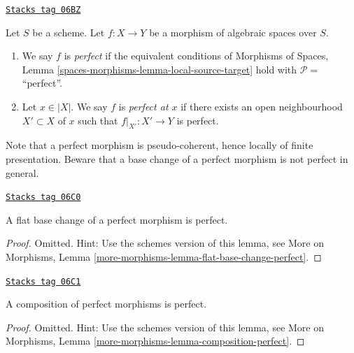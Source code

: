 \begin{definition}[Perfect]
\label{spaces-more-morphisms-definition-perfect}
\href{https://stacks.math.columbia.edu/tag/06BZ}{\texttt{Stacks tag 06BZ}}

Let $S$ be a scheme.
Let $f : X \to Y$ be a morphism of algebraic spaces over $S$.
\begin{enumerate}
\item We say $f$ is {\it perfect} if the equivalent conditions of
Morphisms of Spaces, Lemma \ref{spaces-morphisms-lemma-local-source-target}
hold with $\mathcal{P} =$``perfect''.
\item Let $x \in |X|$. We say $f$ is {\it perfect at $x$} if
there exists an open neighbourhood $X' \subset X$ of $x$ such
that $f|_{X'} : X' \to Y$ is perfect.
\end{enumerate}
\end{definition}

Note that a perfect morphism is pseudo-coherent, hence locally of finite
presentation. Beware that a base change of a perfect morphism is not perfect
in general.

\begin{lemma}
\label{spaces-more-morphisms-lemma-flat-base-change-perfect}
\href{https://stacks.math.columbia.edu/tag/06C0}{\texttt{Stacks tag 06C0}}

A flat base change of a perfect morphism is perfect.
\end{lemma}

\begin{proof}
Omitted. Hint: Use the schemes version of this lemma, see
More on Morphisms,
Lemma \ref{more-morphisms-lemma-flat-base-change-perfect}.
\end{proof}

\begin{lemma}
\label{spaces-more-morphisms-lemma-composition-perfect}
\href{https://stacks.math.columbia.edu/tag/06C1}{\texttt{Stacks tag 06C1}}

A composition of perfect morphisms is perfect.
\end{lemma}

\begin{proof}
Omitted. Hint: Use the schemes version of this lemma, see
More on Morphisms,
Lemma \ref{more-morphisms-lemma-composition-perfect}.
\end{proof}

